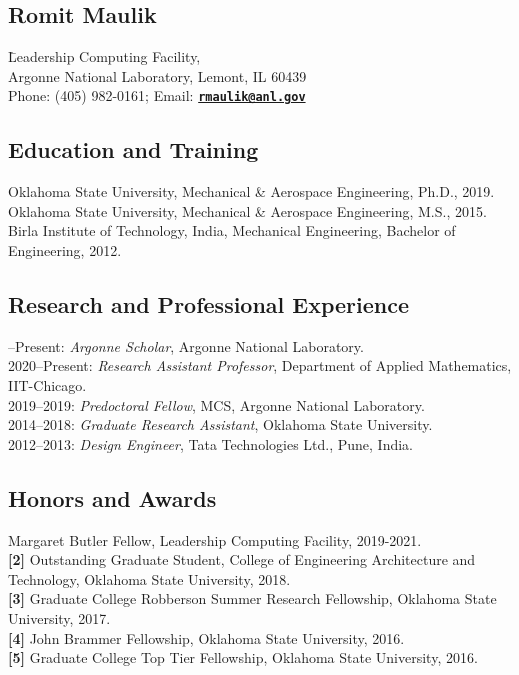\documentclass[11pt]{article}
\begin{document}
\pagestyle{empty}

\subsection*{Romit Maulik}

\begin{tabbing}
  \=Leadership Computing Facility,\\
  \>Argonne National Laboratory, 
Lemont, IL 60439\\
  \>Phone:  (405) 982-0161; Email:  \href{mailto:rmaulik@anl.gov}{\bf \texttt{rmaulik@anl.gov}}
\end{tabbing}


\subsection*{Education and Training}
\noindent	Oklahoma State University, Mechanical \& Aerospace Engineering, Ph.D., 2019.\\
Oklahoma State University, Mechanical \& Aerospace Engineering, M.S., 2015.\\
Birla Institute of Technology, India, Mechanical Engineering, Bachelor of Engineering, 2012.


\subsection*{Research and Professional Experience}
--Present: {\em Argonne Scholar}, Argonne National Laboratory.\\
2020--Present: {\em Research Assistant Professor}, Department of Applied Mathematics, IIT-Chicago.\\
2019--2019: {\em Predoctoral Fellow}, MCS, Argonne National Laboratory.\\ 
2014--2018: {\em Graduate Research Assistant}, Oklahoma State University.\\ 
2012--2013: {\em Design Engineer}, Tata Technologies Ltd., Pune, India.


\subsection*{Honors and Awards}
\noindent {\bf[1]} Margaret Butler Fellow, Leadership Computing Facility, 2019-2021. \\
{\bf[2]} Outstanding Graduate Student, College of Engineering Architecture and Technology, Oklahoma State University, 2018. \\
{\bf[3]} Graduate College Robberson Summer Research Fellowship, Oklahoma State University, 2017. \\
{\bf[4]} John Brammer Fellowship, Oklahoma State University, 2016. \\
{\bf[5]} Graduate College Top Tier Fellowship, Oklahoma State University, 2016.
\end{document}
